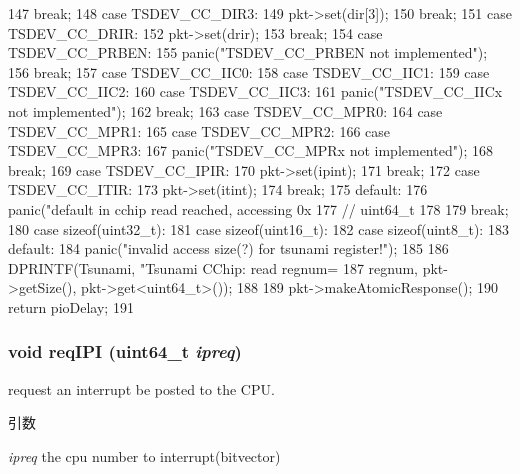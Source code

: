 \begin{DoxyCode}
{{{147                   break;
148               case TSDEV_CC_DIR3:
149                   pkt->set(dir[3]);
150                   break;
151               case TSDEV_CC_DRIR:
152                   pkt->set(drir);
153                   break;
154               case TSDEV_CC_PRBEN:
155                   panic("TSDEV_CC_PRBEN not implemented\n");
156                   break;
157               case TSDEV_CC_IIC0:
158               case TSDEV_CC_IIC1:
159               case TSDEV_CC_IIC2:
160               case TSDEV_CC_IIC3:
161                   panic("TSDEV_CC_IICx not implemented\n");
162                   break;
163               case TSDEV_CC_MPR0:
164               case TSDEV_CC_MPR1:
165               case TSDEV_CC_MPR2:
166               case TSDEV_CC_MPR3:
167                   panic("TSDEV_CC_MPRx not implemented\n");
168                   break;
169               case TSDEV_CC_IPIR:
170                   pkt->set(ipint);
171                   break;
172               case TSDEV_CC_ITIR:
173                   pkt->set(itint);
174                   break;
175               default:
176                   panic("default in cchip read reached, accessing 0x%
177            } // uint64_t
178 
179       break;
180       case sizeof(uint32_t):
181       case sizeof(uint16_t):
182       case sizeof(uint8_t):
183       default:
184         panic("invalid access size(?) for tsunami register!\n");
185     }
186     DPRINTF(Tsunami, "Tsunami CChip: read  regnum=%
187             regnum, pkt->getSize(), pkt->get<uint64_t>());
188 
189     pkt->makeAtomicResponse();
190     return pioDelay;
191 }
\end{DoxyCode}
\hypertarget{classTsunamiCChip_a1f4571959aa97b26452f6accc79abffe}{
\subsubsection[{reqIPI}]{\setlength{\rightskip}{0pt plus 5cm}void reqIPI (uint64\_\-t {\em ipreq})}}
\label{classTsunamiCChip_a1f4571959aa97b26452f6accc79abffe}
request an interrupt be posted to the CPU. 
\begin{DoxyParams}{引数}
\item[{\em ipreq}]the cpu number to interrupt(bitvector) \end{DoxyParams}



